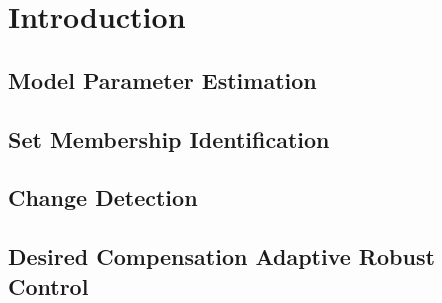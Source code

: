 \chapter{Introduction}
\section{Model Parameter Estimation}
\section{Set Membership Identification}
\section{Change Detection}
\section{Desired Compensation Adaptive Robust Control}
